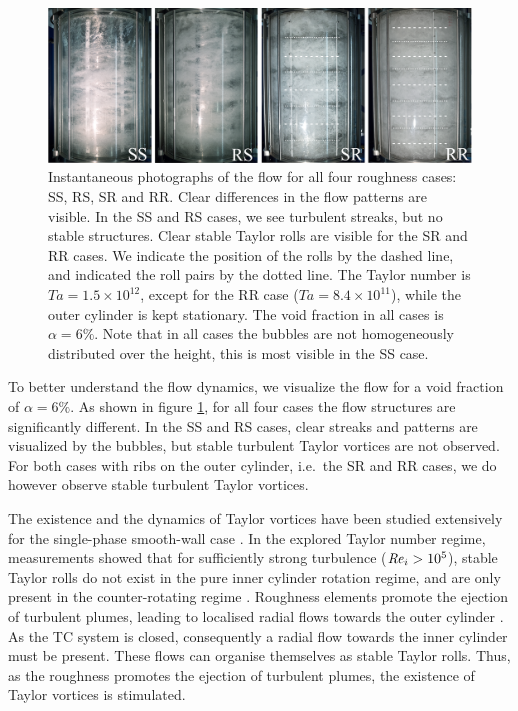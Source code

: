 \documentclass{jfm}
\renewcommand{\Re}{\Rey}
\newcommand{\Ta}{T\!a}
\begin{document}
\begin{figure}
\centering
\includegraphics[width=\textwidth]{fig4}
\caption{Instantaneous photographs of the flow for all four roughness cases: SS, RS, SR and RR. Clear differences in the flow patterns are visible. In the SS and RS cases, we see turbulent streaks, but no stable structures. Clear stable Taylor rolls are visible for the SR and RR cases. We indicate the position of the rolls by the dashed line, and indicated the roll pairs by the dotted line. The Taylor number is $\Ta= 1.5\times 10^{12}$, except for the RR case ($\Ta = 8.4\times 10^{11}$), while the outer cylinder is kept stationary. The void fraction in all cases is $\alpha=6\%$. Note that in all cases the bubbles are not homogeneously distributed  over the height, this is most visible in the SS case.}
\label{Chap_Seven_fig:visu}
\end{figure}

To better understand the flow dynamics, we visualize the flow for a void fraction of $\alpha=6\%$. As shown in figure \ref{Chap_Seven_fig:visu}, for all four cases the flow structures are significantly different. In the SS and RS cases, clear streaks and patterns are visualized by the bubbles, but stable turbulent Taylor vortices are not observed. For both cases with ribs on the outer cylinder, i.e.\  the SR and RR cases, we do however observe stable turbulent Taylor vortices. 

The existence and the dynamics of Taylor vortices have been studied extensively for the single-phase smooth-wall case  \citep{lat92a,lat92,lew99,hui14,vee16b,gro16}. In the explored Taylor number regime, measurements showed that for sufficiently strong turbulence ($\Re_i>10^5$),  stable Taylor rolls do not exist in the pure inner cylinder rotation regime, and are only present in the counter-rotating regime \citep{ost14pd,gro16}.  Roughness elements promote the ejection of turbulent plumes, leading to localised radial flows towards the outer cylinder  \citep{zhu16,top17}. As the TC system is closed, consequently a radial flow towards the inner cylinder must be present. These flows can organise themselves as stable Taylor rolls. Thus, as the roughness promotes the ejection of turbulent plumes, the existence of Taylor vortices is stimulated.
\end{document}
